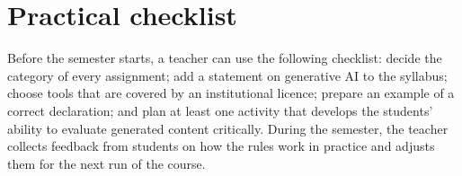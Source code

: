 \documentclass[11pt,a4paper]{article}
\begin{document}
\section{Practical checklist}

Before the semester starts, a teacher can use the following checklist:
decide the category of every assignment; add a statement on generative AI to
the syllabus; choose tools that are covered by an institutional licence;
prepare an example of a correct declaration; and plan at least one activity
that develops the students' ability to evaluate generated content critically.
During the semester, the teacher collects feedback from students on how the
rules work in practice and adjusts them for the next run of the course.
\end{document}
